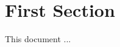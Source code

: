 \documentclass[a4paper,10pt]{article}
\begin{document}
 


\tableofcontents

 
\section{First Section}

This document ... \cite{einstein}
 

 
\end{document}
